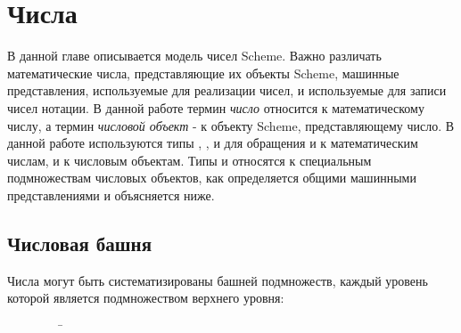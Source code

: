 \chapter{Числа}
\label{numbertypeschapter}

В данной главе описывается модель чисел Scheme. Важно различать математические числа,
представляющие их объекты Scheme, машинные представления, используемые для реализации чисел, и
используемые для записи чисел нотации. В данной работе термин \textit{число} относится к
математическому числу, а термин \textit{числовой объект} - к объекту Scheme, представляющему
число. В данной работе используются типы , ,  и
 для обращения и к математическим числам, и к числовым объектам. Типы
 и  относятся к специальным подмножествам числовых объектов, как
определяется общими машинными представлениями и объясняется ниже.

\section{Числовая башня}
\label{numericaltypes}

Числа могут быть систематизированы башней подмножеств, каждый уровень которой является
подмножеством верхнего уровня:
\begin{tabbing}
\ \ \ \ \ \ \ \ \ \= \\
\>  \\
\>  \\
\>  \\
\> 
\end{tabbing}

